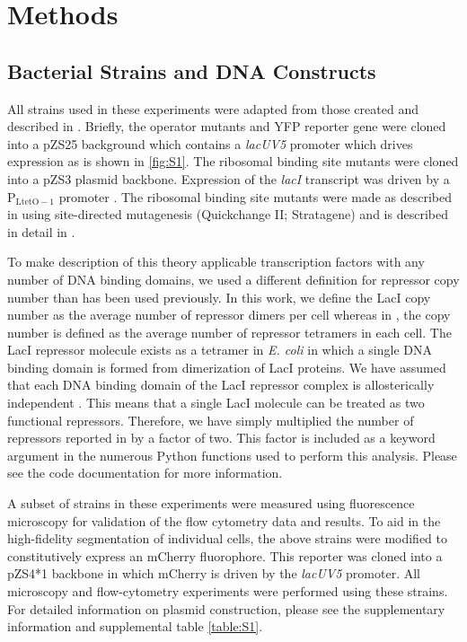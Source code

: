 \section*{Methods }


\subsection*{Bacterial Strains and DNA Constructs}
All strains used in these experiments were adapted from those created and
described in \cite{Garcia2011}. Briefly, the operator mutants and YFP reporter
gene were cloned into a pZS25 background which contains a \textit{lacUV5}
promoter which drives expression as is shown in \ref{fig:S1}. The ribosomal
binding site mutants were cloned into a pZS3 plasmid backbone. Expression of
the \textit{lacI} transcript was driven by a P$_\mathrm{LtetO-1}$ promoter
\cite{Lutz1997}. The ribosomal binding site mutants were made as described in
\cite{Salis2009} using site-directed mutagenesis (Quickchange II; Stratagene)
and is described in detail in \cite{Garcia2011}.

To make description of this theory applicable transcription factors with any
number of DNA binding domains, we used a different definition for repressor
copy number than has been used previously. In this work, we define the LacI
copy number as the average number of repressor dimers per cell  whereas in
\cite{Garcia2011}, the copy number is defined as the average number of
repressor tetramers in each cell. The LacI repressor molecule exists as a
tetramer in \textit{E. coli}  in which a single
DNA binding domain is formed from dimerization of LacI proteins. We have
assumed that each DNA binding domain of the LacI repressor complex is
allosterically independent . This means that a single LacI molecule can be treated as two
functional repressors. Therefore, we have simply multiplied the number of
repressors reported in \cite{Garcia2011} by a factor of two. This factor is
included as a keyword argument in the numerous Python functions used to perform
this analysis. Please see the code documentation for more information.

A subset of strains in these experiments were measured using fluorescence
microscopy for validation of the flow cytometry data and results. To aid in the
high-fidelity segmentation of individual cells, the above strains were modified
to constitutively express an mCherry fluorophore. This reporter was cloned into
a pZS4*1 backbone in which mCherry is driven by the \textit{lacUV5} promoter.
All microscopy and flow-cytometry experiments were performed using these
strains. For detailed information on plasmid construction, please see the
supplementary information and supplemental table \ref{table:S1}.

